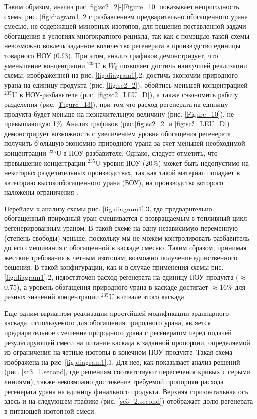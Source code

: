 Таким образом, анализ рис.\ref{fig:sc2_2}-\ref{Figure_10} показывает непригодность схемы рис. \ref{fig:diagram1}.2 с разбавлением предварительно обогащенного урана смесью, не содержащей минорных изотопов, для решения поставленной задачи обогащения в условиях многократного рецикла, так как с помощью такой схемы невозможно вовлечь заданное количество регенерата в производство единицы товарного НОУ (0.93). При этом, анализ графиков демонстрирует, что уменьшение концентрации $^{235}$U в $W_0$ позволяет достичь наилучшей реализации схемы, изображенной на рис. \ref{fig:diagram1}.2: достичь экономии природного урана на единицу продукта (рис. \ref{fig:sc2_2}), обойтись меньшей концентрацией $^{235}$U в НОУ-разбавителе (рис. \ref{fig:sc2_LEU_D}), а также сэкономить работу разделения (рис. \ref{Figure_13}), при том что расход регенерата на единицу продукта будет меньше на незначительную величину (рис. \ref{Figure_10}), не превышающую 1\%. Анализ графиков (рис.\ref{fig:sc2_2} и \ref{fig:sc2_LEU_D}) демонстрирует возможность с увеличением уровня обогащения регенерата получить б'ольшую экономию природного урана за счет меньшей необходимой концентрации $^{235}$U в НОУ-разбавителе. Однако, следует отметить, что превышение концентрации $^{235}$U уровня НОУ (20\%) может быть недопустимо на некоторых разделительных производствах, так как такой материал попадает в категорию высокообогащенного урана (ВОУ), на производство которого наложены ограничения \cite{gusevProliferationResistanceAnalysis2019}.


Перейдем к анализу схемы рис. \ref{fig:diagram1}.3, где предварительно обогащенный природный уран смешивается с возвращаемым в топливный цикл регенерированным ураном. В такой схеме на одну независимую переменную (степень свободы) меньше, поскольку мы не можем контролировать разбавитель до его смешивания с обогащенной в каскаде смесью. Таким образом, принимая жесткие требования к четным изотопам, возможно получение единственного решения. В такой конфигурации, как и в случае применения схемы рис. \ref{fig:diagram1}.2, недостаточен расход регенерата на единицу НОУ-продукта ($\approx$0,75), а уровень обогащения природного урана в каскаде достигает $\approx$16\% для разных значений концентрации $^{235}$U в отвале этого каскада.

Еще одним вариантом реализации простейшей модификации ординарного каскада, используемого для обогащения природного урана, является предварительное смешение природного урана с регенератом перед подачей результирующей смеси на питание каскада в заданной пропорции, определяемой из ограничения на четные изотопы в конечном НОУ-продукте. Такая схема изображена на рис. \ref{fig:diagram1}.1. Для нее, как показывает анализ решений (рис. \ref{sc3_1.second}, где решениям соответствуют пересечения кривых с серыми линиями), также невозможно достижение требуемой пропорции расхода регенерата урана на единицу финального продукта. Верхняя горизонтальная ось здесь и на следующем графике (рис. \ref{sc3_2.second}) отображает долю регенерата в питающей изотопной смеси.

